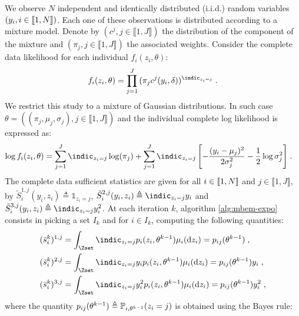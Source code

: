 \begin{exmp}
We observe $N$ independent and identically distributed (i.i.d.) random variables $ (y_i, i \in \llbracket1,N\rrbracket)$. Each one of these observations is distributed according to a mixture model. Denote by $(c^j, j \in \llbracket 1, J \rrbracket)$ the distribution of the component of the mixture and $(\pi_j, j \in \llbracket 1, J \rrbracket)$ the associated weights. Consider the complete data likelihood for each individual $f_i( z_i, \theta)$:
\begin{align} \label{eq1}
f_i( z_i, \theta) = \prod_{j=1}^{J}{(\pi_j c^j(y_i,\delta))^{\indic_{z_i=j}}}\eqs.
\end{align}
We restrict this study to a mixture of Gaussian distributions. In such case $\theta = ((\pi_j, \mu_j, \sigma_j), j \in \llbracket 1, J \rrbracket)$ and the individual complete log likelihood is expressed as:
\begin{align}
\log f_i( z_i, \theta) & = \sum_{j=1}^{J}{\indic_{z_i=j}\log(\pi_j)} + \sum_{j=1}^{J}{\indic_{z_i=j}\left[-\frac{(y_i - \mu_j)^2}{2\sigma^2_j} - \frac{1}{2}\log \sigma^2_j\right]}\eqs.
\end{align}
The complete data sufficient statistics are given for all $i \in \llbracket1,N\rrbracket$ and $j \in \llbracket1,J\rrbracket$, by $\tilde{S}_i^{1,j}(y_i,z_i) \triangleq \mathbb{1}_{z_i=j}$, $\tilde{S}_i^{2,j}(y_i,z_i) \triangleq \indic_{z_i=j}y_i$ and $\tilde{S}_i^{3,j}(y_i,z_i) \triangleq \indic_{z_i=j}y_i^2$.
At each iteration $k$, algorithm \ref{alg:mbem-expo} consists in picking a set $I_k$ and for $i \in I_k$, computing the following quantities:
\begin{align}
& (\bar{s}_i^k)^{1,j} = \int_{\Zset}{\indic_{z_i=j}p_i(z_i,\theta^{k-1}) \mu_i(\dz_i)} = p_{ij}(\theta^{k-1})\eqs,\\
& (\bar{s}_i^k)^{2,j} = \int_{\Zset}{\indic_{z_i=j}y_ip_i(z_i,\theta^{k-1}) \mu_i(\dz_i)} = p_{ij}(\theta^{k-1})y_i\eqs,\\
& (\bar{s}_i^k)^{3,j} = \int_{\Zset}{\indic_{z_i=j}y_i^2p_i(z_i,\theta^{k-1}) \mu_i(\dz_i)} = p_{ij}(\theta^{k-1})y_i^2\eqs,
\end{align}
where the quantity $p_{ij}(\theta^{k-1}) \triangleq \mathbb{P}_{i,\theta^{k-1}}(z_i = j)$ is obtained using the Bayes rule:

\end{exmp}

